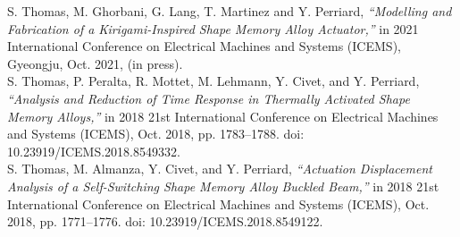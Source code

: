 S. Thomas, M. Ghorbani, G. Lang, T. Martinez and Y. Perriard, \textit{“Modelling and Fabrication of a Kirigami-Inspired Shape Memory Alloy Actuator,”} in 2021 International Conference on Electrical Machines and Systems (ICEMS), Gyeongju, Oct. 2021, (in press).\\

S. Thomas, P. Peralta, R. Mottet, M. Lehmann, Y. Civet, and Y. Perriard, \textit{“Analysis and Reduction of Time Response in Thermally Activated Shape Memory Alloys,”} in 2018 21st International Conference on Electrical Machines and Systems (ICEMS), Oct. 2018, pp. 1783–1788. doi: 10.23919/ICEMS.2018.8549332.\\

S. Thomas, M. Almanza, Y. Civet, and Y. Perriard, \textit{“Actuation Displacement Analysis of a Self-Switching Shape Memory Alloy Buckled Beam,”} in 2018 21st International Conference on Electrical Machines and Systems (ICEMS), Oct. 2018, pp. 1771–1776. doi: 10.23919/ICEMS.2018.8549122.
